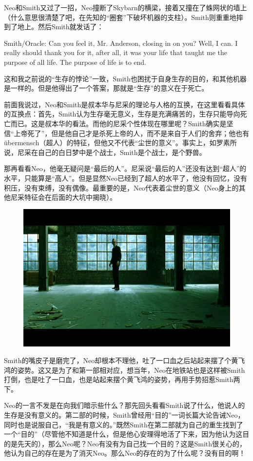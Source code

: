 \documentclass[UTF8]{ctexart}
\newenvironment{myquote}{\color{green} \setlength{\leftskip}{6em} \setlength{\rightskip}{4em} \setlength{\parindent}{-2em}}{\par}
\begin{document}
Neo和Smith又过了一招，Neo撞断了Skybarn的横梁，接着又撞在了蛛网状的墙上（什么意思很清楚了吧，在先知的“圈套”下破坏机器的支柱）。Smith则重重地摔到了地上。然后Smith就发话了：

\begin{myquote}
Smith/Oracle: Can you feel it, Mr. Anderson, closing in on you? Well, I can. I really should thank you for it, after all, it was your life that taught me the purpose of all life. The purpose of life is to end.
\end{myquote}

这和我之前说的“生存的悖论”一致，Smith也困扰于自身生存的目的，和其他机器是一样的。但是他得出了一个答案，那就是“生存”的意义在于死亡。

前面我说过，Neo和Smith是叔本华与尼采的理论与人格的互换，在这里看看具体的互换点：首先，Smith认为生存毫无意义，生存是充满痛苦的，生存只能导向死亡而已。这是叔本华的看法。而他的尼采个性体现在哪里呢？Smith确实是坚信“上帝死了”，但是他自己才是杀死上帝的人，而不是来自于人们的舍弃；他也有übermensch（超人）的特征，但他又不代表“尘世的意义”。事实上，如罗素所说，尼采在自己的白日梦中是个战士，Smith是个战士，是个野兽。

那再看看Neo，他毫无疑问是“最后的人”。尼采说“最后的人”还没有达到“超人”的水平，只能算是“高人”。但是显然Neo已经到了超人的水平了，他没有回忆，没有积压，没有束缚，没有偶像。最重要的是，Neo代表着尘世的意义（Neo身上的其他尼采特征会在后面的大坑中揭晓）。

\begin{figure}[htb]
\centering
\includegraphics[width=0.5\linewidth]{fig/63466a602ff51d46eaf8f84f.jpg}
\end{figure}

Smith的嘴皮子是磨完了，Neo却根本不理他，吐了一口血之后站起来摆了个黄飞鸿的姿势。这又是为了和第一部相对应，想当年，Neo在地铁站也是这样被Smith打倒，也是吐了一口血，也是站起来摆个黄飞鸿的姿势，再用手势招惹Smith两下。

Neo的一言不发是在向我们暗示些什么？那先回头看看Smith说了什么，他说人的生存是没有意义的。第二部的时候，Smith曾经用“目的”一词长篇大论告诫Neo，同时也是说服自己，“我是有意义的。”既然Smith在第二部就为自己的重生找到了一个“目的”（尽管他不知道是什么，但是他心安理得地活了下来，因为他认为这目的是先天的），那么Neo呢？Neo有没有为自己找一个目的？这是Smith很关心的，他认为自己的存在是为了消灭Neo。那么Neo的存在的为了什么呢？没有目的啊！
\end{document}
